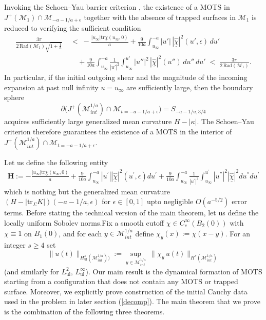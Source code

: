 \documentclass{amsart}
\newcommand{\chibar}{\underline{\chi}}
\newcommand{\chibarhat}{\underline{\hat{\chi}}}
\newcommand{\tr}{\mbox{tr}}
\begin{document}
\noindent Invoking the Schoen–Yau barrier criterion \cite{yau}, the existence of a MOTS in
$J^{+}(\mathcal M_{1})\cap \mathcal M_{-a-1/a+\epsilon}$ together with the absence of
trapped surfaces in $\mathcal M_{1}$ is reduced to verifying the sufficient condition
\begin{align}
\label{eq:yau-condition-final}
\frac{3\pi}{2\,\text{Rad}(\mathcal M_{1})\sqrt{1+\frac{1}{a}}}
\;&<\;
-\frac{|u_{\infty}|\tr\underline\chi(u_{\infty},0)}{a}
+\frac{9}{10a}\int_{u_{\infty}}^{-a}|u'|\,|\hat{\underline\chi}|^{2}(u',\epsilon)\,du'
\\
&\quad
+\frac{9}{10a}\int_{u_{\infty}}^{-a}\frac{1}{|u'|^{2}}
\int_{u_{\infty}}^{u'} |u''|^{2}\,
|\hat{\underline\chi}|^{2}(u'')\,du''\,du'
\;<\;
\frac{3\pi}{2\,\text{Rad}(\mathcal M_{1})}.
\nonumber
\end{align}
In particular, if the initial outgoing shear and the magnitude of the incoming expansion
at past null infinity $u=u_{\infty}$ are sufficiently large, then the boundary sphere
\[
\partial\!\Big(J^{+}(\mathcal{M}^{1/a}_{int})
\cap \mathcal M_{t=-a-1/a+\epsilon}\Big)
=
S_{-a-1/a,3/4}
\]
acquires sufficiently large generalized mean curvature $H-|\kappa|$. The
Schoen–Yau criterion therefore guarantees the existence of a MOTS in the interior of
$J^{+}(\mathcal M^{1/a}_{int})
\cap \mathcal M_{t=-a-1/a+\epsilon}$.

\noindent Let us define the following entity 
\begin{align}
\label{eq:gmc}
\mathbf{H}:=-\frac{|u_{\infty}|\tr\chibar(u_{\infty},0)}{a}+\frac{9}{10a}\int_{u_{\infty}}^{-a}|u^{'}||\chibarhat|^{2}(u^{'},\epsilon)du^{'}
+\frac{9}{10a}\int_{u_{\infty}}^{-a}\frac{1}{|u^{'}|^{2}}\int_{u_{\infty}}^{u^{'}}|u^{''}|^{2}|\chibarhat|^{2}du^{''}du^{'}    
\end{align}
which is nothing but the generalized mean curvature $(H-|\tr_{\Sigma}K|)(-a-1/a,\epsilon)$ for $\epsilon \in [0,1]$ upto negligible $O(a^{-5/2})$ error terms. Before stating the technical version of the main theorem, let us define the locally uniform Sobolev norms.Fix a smooth cutoff $\chi\in C_c^\infty(B_2(0))$ with $\chi\equiv1$ on $B_1(0)$, and for each
$y\in\mathcal{M}^{1/a}_{int}$ define $\chi_y(x):=\chi(x-y)$. For an integer $s\ge 4$ set
\[
\|u(t)\|_{H^s_{\mathrm{ul}}(\mathcal{M}^{1/a}_{int}))}
:=\sup_{y\in\mathcal{M}^{1/a}_{int}}\ \|\chi_y\,u(t)\|_{H^s(\mathcal{M}^{1/a}_{int})}
\]
(and similarly for $L^2_{\mathrm{ul}},\,L^\infty_{\mathrm{ul}}$). Our main result is the dynamical formation of MOTS starting from a configuration that does not contain any MOTS or trapped surface. Moreover, we explicitly prove construction of the initial Cauchy data used in the problem in later section (\ref{decomp}). The main theorem that we prove is the combination of the following three theorems. 
\end{document}
